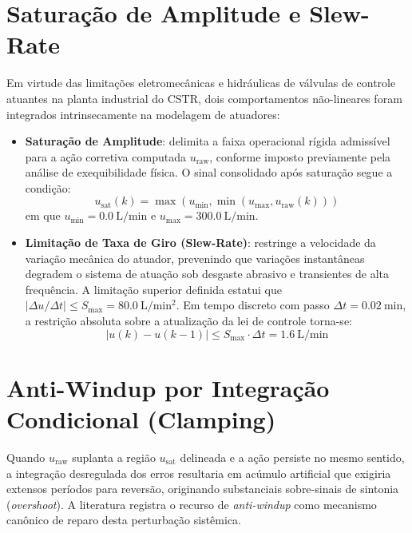\section{Saturação de Amplitude e Slew-Rate}
\label{sec:saturacao_slew_rate}

Em virtude das limitações eletromecânicas e hidráulicas de válvulas de controle atuantes na planta industrial do CSTR, dois comportamentos não-lineares foram integrados intrinsecamente na modelagem de atuadores:
\begin{itemize}
    \item \textbf{Saturação de Amplitude}: delimita a faixa operacional rígida admissível para a ação corretiva computada $u_{\text{raw}}$, conforme imposto previamente pela análise de exequibilidade física. O sinal consolidado após saturação segue a condição:
    \begin{equation}
        u_{\text{sat}}(k) = \max\left(u_{\min}, \min(u_{\max}, u_{\text{raw}}(k))\right)
    \end{equation}
    em que $u_{\min} = \SI{0.0}{\liter\per\minute}$ e $u_{\max} = \SI{300.0}{\liter\per\minute}$.
    
    \item \textbf{Limitação de Taxa de Giro (Slew-Rate)}: restringe a velocidade da variação mecânica do atuador, prevenindo que variações instantâneas degradem o sistema de atuação sob desgaste abrasivo e transientes de alta frequência. A limitação superior definida estatui que $|\Delta u/\Delta t| \le S_{\max} = \SI{80.0}{\liter\per\minute\squared}$. Em tempo discreto com passo $\Delta t = \SI{0.02}{\minute}$, a restrição absoluta sobre a atualização da lei de controle torna-se:
    \begin{equation}
        |u(k) - u(k-1)| \le S_{\max} \cdot \Delta t = \SI{1.6}{\liter\per\minute}
    \end{equation}
\end{itemize}

\section{Anti-Windup por Integração Condicional (Clamping)}
\label{sec:anti_windup}

Quando $u_{\text{raw}}$ suplanta a região $u_{\text{sat}}$ delineada e a ação persiste no mesmo sentido, a integração desregulada dos erros resultaria em acúmulo artificial que exigiria extensos períodos para reversão, originando substanciais sobre-sinais de sintonia (\textit{overshoot}). A literatura registra o recurso de \textit{anti-windup} como mecanismo canônico de reparo desta perturbação sistêmica.

